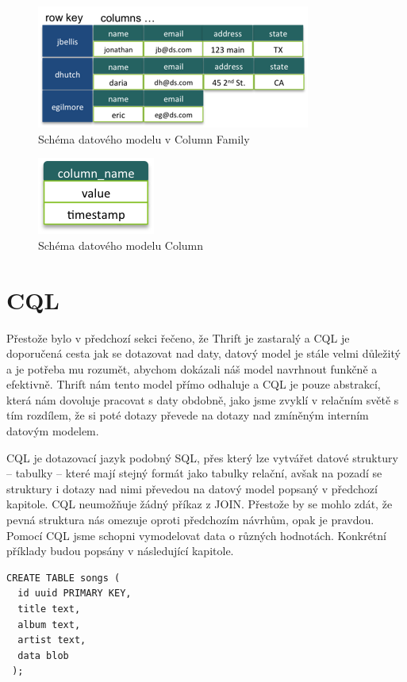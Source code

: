\begin{figure}[!h]
\centering
\includegraphics[scale=0.95]{images/static_column_family}
\caption{Schéma datového modelu v Column Family}
\label{fig:vnodes}
\end{figure}

\begin{figure}[!h]
\centering
\includegraphics[scale=1.5]{images/column}
\caption{Schéma datového modelu Column}
\label{fig:vnodes}
\end{figure}

\section{CQL}
Přestože bylo v předchozí sekci řečeno, že Thrift je zastaralý a CQL je doporučená cesta jak se dotazovat nad daty, datový model je stále velmi důležitý a je potřeba mu rozumět, abychom dokázali náš model navrhnout funkčně a efektivně. Thrift nám tento model přímo odhaluje a CQL je pouze abstrakcí, která nám dovoluje pracovat s daty obdobně, jako jsme zvyklí v relačním světě s tím rozdílem, že si poté dotazy převede na dotazy nad zmíněným interním datovým modelem. 

CQL je dotazovací jazyk podobný SQL, přes který lze vytvářet datové struktury – tabulky – které mají stejný formát jako tabulky relační, avšak na pozadí se struktury i dotazy nad nimi převedou na datový model popsaný v předchozí kapitole. CQL neumožňuje žádný příkaz z  JOIN. Přestože by se mohlo zdát, že pevná struktura nás omezuje oproti předchozím návrhům, opak je pravdou. Pomocí CQL jsme schopni vymodelovat data o různých hodnotách. Konkrétní příklady budou popsány v následující kapitole. 

\newpage

\begin{lstlisting}[caption={Tvorba jednoduché tabulky pomocí CQL},label=CQL1]
CREATE TABLE songs (
  id uuid PRIMARY KEY,
  title text,
  album text,
  artist text,
  data blob
 );
\end{lstlisting}

